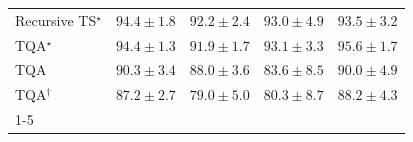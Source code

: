 \begin{tabular}{l|cccc|}
Recursive TS$^\star$ & {\cellcolor[HTML]{034C78}} \color[HTML]{F1F1F1} $94.4\pm 1.8$ & {\cellcolor[HTML]{045A8D}} \color[HTML]{F1F1F1} $92.2\pm 2.4$ & {\cellcolor[HTML]{045585}} \color[HTML]{F1F1F1} $93.0\pm 4.9$ & {\cellcolor[HTML]{045280}} \color[HTML]{F1F1F1} $93.5\pm 3.2$ \\
TQA$^\star$ & {\cellcolor[HTML]{034C78}} \color[HTML]{F1F1F1} $94.4\pm 1.3$ & {\cellcolor[HTML]{045B8E}} \color[HTML]{F1F1F1} $91.9\pm 1.7$ & {\cellcolor[HTML]{045585}} \color[HTML]{F1F1F1} $93.1\pm 3.3$ & {\cellcolor[HTML]{03466E}} \color[HTML]{F1F1F1} $95.6\pm 1.7$ \\
TQA & {\cellcolor[HTML]{046198}} \color[HTML]{F1F1F1} $90.3\pm 3.4$ & {\cellcolor[HTML]{056AA6}} \color[HTML]{F1F1F1} $88.0\pm 3.6$ & {\cellcolor[HTML]{1C7FB8}} \color[HTML]{F1F1F1} $83.6\pm 8.5$ & {\cellcolor[HTML]{04629A}} \color[HTML]{F1F1F1} $90.0\pm 4.9$ \\
TQA$^\dagger$ & {\cellcolor[HTML]{056DAB}} \color[HTML]{F1F1F1} $87.2\pm 2.7$ & {\cellcolor[HTML]{4897C4}} \color[HTML]{F1F1F1} $79.0\pm 5.0$ & {\cellcolor[HTML]{3B92C1}} \color[HTML]{F1F1F1} $80.3\pm 8.7$ & {\cellcolor[HTML]{0569A5}} \color[HTML]{F1F1F1} $88.2\pm 4.3$ \\
\cline{1-5}
\bottomrule
\end{tabular}
